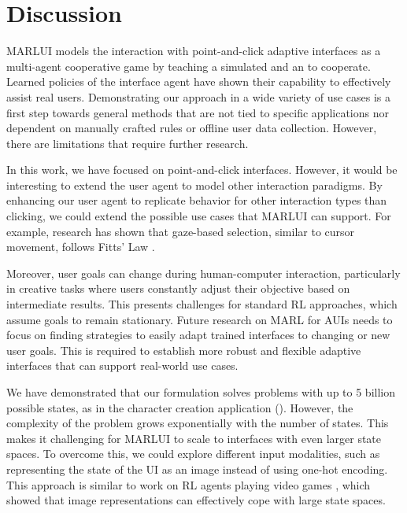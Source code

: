 \section{Discussion}
\label{sec:limitations}
MARLUI models the interaction with point-and-click adaptive interfaces as a multi-agent cooperative game by teaching a simulated \useragent and an \interfaceagent to cooperate. Learned policies of the interface agent have shown their capability to effectively assist real users. Demonstrating our approach in a wide variety of use cases is a first step towards general methods that are not tied to specific applications nor dependent on manually crafted rules or offline user data collection. However, there are limitations that require further research.

In this work, we have focused on point-and-click interfaces. However, it would be interesting to extend the user agent to model other interaction paradigms. By enhancing our user agent to replicate behavior for other interaction types than clicking, we could extend the possible use cases that MARLUI can support. For example, research has shown that gaze-based selection, similar to cursor movement, follows Fitts' Law \cite{schuetz2019explanation}.  

Moreover, user goals can change during human-computer interaction, particularly in creative tasks where users constantly adjust their objective based on intermediate results. This presents challenges for standard RL approaches, which assume goals to remain stationary. Future research on MARL for AUIs needs to focus on finding strategies to easily adapt trained interfaces to changing or new user goals. This is required to establish more robust and flexible adaptive interfaces that can support real-world use cases.

We have demonstrated that our formulation solves problems with up to 5 billion possible states, as in the character creation application (). However, the complexity of the problem grows exponentially with the number of states. This makes it challenging for MARLUI to scale to interfaces with even larger state spaces. To overcome this, we could explore different input modalities, such as representing the state of the UI as an image instead of using one-hot encoding. This approach is similar to work on RL agents playing video games \cite{mnih2013playing}, which showed that image representations can effectively cope with large state spaces.

